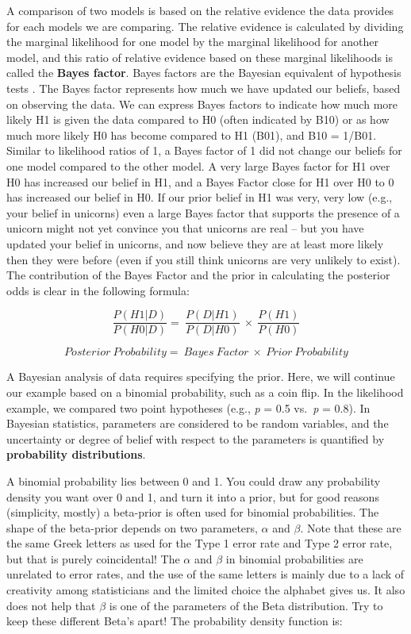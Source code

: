 \documentclass[
]{krantz}
\begin{document}
A comparison of two models is based on the relative evidence the data provides for each models we are comparing. The relative evidence is calculated by dividing the marginal likelihood for one model by the marginal likelihood for another model, and this ratio of relative evidence based on these marginal likelihoods is called the \textbf{Bayes factor}. Bayes factors are the Bayesian equivalent of hypothesis tests \citep{dienes_understanding_2008}. The Bayes factor represents how much we have updated our beliefs, based on observing the data. We can express Bayes factors to indicate how much more likely H1 is given the data compared to H0 (often indicated by B10) or as how much more likely H0 has become compared to H1 (B01), and B10 = 1/B01. Similar to likelihood ratios of 1, a Bayes factor of 1 did not change our beliefs for one model compared to the other model. A very large Bayes factor for H1 over H0 has increased our belief in H1, and a Bayes Factor close for H1 over H0 to 0 has increased our belief in H0. If our prior belief in H1 was very, very low (e.g., your belief in unicorns) even a large Bayes factor that supports the presence of a unicorn might not yet convince you that unicorns are real -- but you have updated your belief in unicorns, and now believe they are at least more likely then they were before (even if you still think unicorns are very unlikely to exist). The contribution of the Bayes Factor and the prior in calculating the posterior odds is clear in the following formula:

\[
\frac{P(H1|D)}{P(H0|D)} = \ \frac{P(D|H1)}{P(D|H0)}\  \times \ \frac{P(H1)}{P(H0)}
\]

\[
Posterior\ Probability = \ Bayes\ Factor\  \times \ Prior\ Probability
\]

A Bayesian analysis of data requires specifying the prior. Here, we will continue our example based on a binomial probability, such as a coin flip. In the likelihood example, we compared two point hypotheses (e.g., \emph{p} = 0.5 vs.~\emph{p} = 0.8). In Bayesian statistics, parameters are considered to be random variables, and the uncertainty or degree of belief with respect to the parameters is quantified by \textbf{probability distributions}.

A binomial probability lies between 0 and 1. You could draw any probability density you want over 0 and 1, and turn it into a prior, but for good reasons (simplicity, mostly) a beta-prior is often used for binomial probabilities. The shape of the beta-prior depends on two parameters, \(\alpha\) and \(\beta\). Note that these are the same Greek letters as used for the Type 1 error rate and Type 2 error rate, but that is purely coincidental! The \(\alpha\) and \(\beta\) in binomial probabilities are unrelated to error rates, and the use of the same letters is mainly due to a
lack of creativity among statisticians and the limited choice the alphabet gives us. It also does not help that \(\beta\) is one of the parameters of the Beta distribution. Try to keep these different Beta's apart! The probability density function is:
\end{document}
